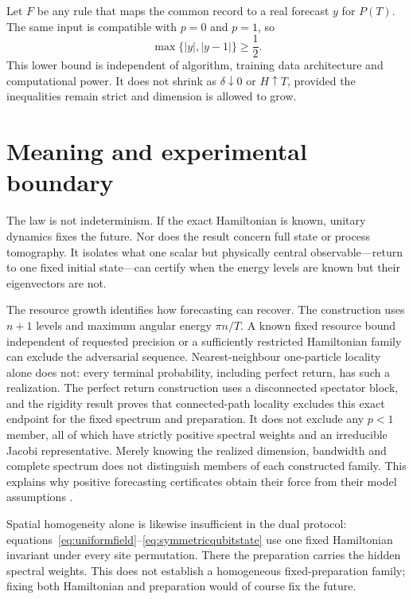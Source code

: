 \documentclass[12pt]{article}
\begin{document}
Let \(F\) be any rule that maps the common record to a real forecast \(y\)
for \(P(T)\). The same input is compatible with \(p=0\) and \(p=1\), so
\begin{equation}
 \max\{|y|,|y-1|\}\geq\frac12.
\label{eq:minimax}
\end{equation}
This lower bound is independent of algorithm, training data architecture
and computational power. It does not shrink as \(\delta\downarrow0\) or
\(H\uparrow T\), provided the inequalities remain strict and dimension is
allowed to grow.

\section*{Meaning and experimental boundary}

The law is not indeterminism. If the exact Hamiltonian is known, unitary
dynamics fixes the future. Nor does the result concern full state or process
tomography. It isolates what one scalar but physically central
observable---return to one fixed initial state---can certify when the energy
levels are known but their eigenvectors are not.

The resource growth identifies how forecasting can recover. The construction
uses \(n+1\) levels and maximum angular energy \(\pi n/T\). A known
fixed resource bound independent of requested precision or a sufficiently
restricted Hamiltonian family can exclude the adversarial sequence.
Nearest-neighbour one-particle locality alone does not: every terminal
probability, including perfect return, has such a realization. The perfect
return construction uses a disconnected spectator block, and the rigidity
result proves that connected-path locality excludes this exact endpoint for
the fixed spectrum and preparation. It does not exclude any \(p<1\)
member, all of which have strictly positive spectral weights and an
irreducible Jacobi representative. Merely knowing the realized dimension,
bandwidth and complete spectrum does not distinguish members of each
constructed family. This explains why positive forecasting certificates
obtain their force from their model assumptions \cite{Valls2026,Manos2026}.

Spatial homogeneity alone is likewise insufficient in the dual protocol:
equations~\eqref{eq:uniformfield}--\eqref{eq:symmetricqubitstate} use one
fixed Hamiltonian invariant under every site permutation. There the
preparation carries the hidden spectral weights. This does not establish a
homogeneous fixed-preparation family; fixing both Hamiltonian and
preparation would of course fix the future.
\end{document}

